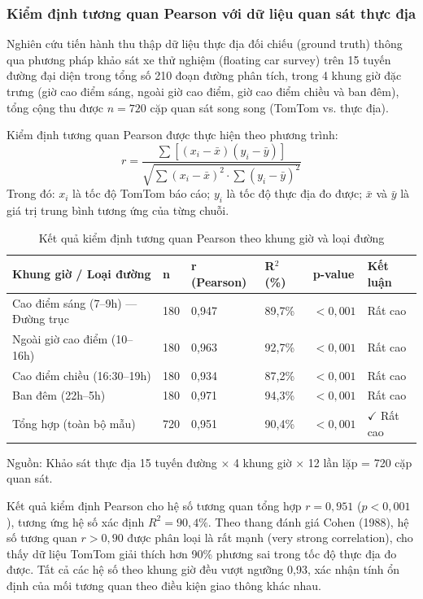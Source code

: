 \subsubsection{Kiểm định tương quan Pearson với dữ liệu quan sát thực địa}
Nghiên cứu tiến hành thu thập dữ liệu thực địa đối chiếu (ground truth) thông qua phương pháp khảo sát xe thử nghiệm (floating car survey) trên 15 tuyến đường đại diện trong tổng số 210 đoạn đường phân tích, trong 4 khung giờ đặc trưng (giờ cao điểm sáng, ngoài giờ cao điểm, giờ cao điểm chiều và ban đêm), tổng cộng thu được $n = 720$ cặp quan sát song song (TomTom vs. thực địa).

Kiểm định tương quan Pearson được thực hiện theo phương trình:
\[
r = \frac{\sum[(x_i - \bar{x})(y_i - \bar{y})]}{\sqrt{\sum(x_i - \bar{x})^2 \cdot \sum(y_i - \bar{y})^2}}
\]
Trong đó: $x_i$ là tốc độ TomTom báo cáo; $y_i$ là tốc độ thực địa đo được; $\bar{x}$ và $\bar{y}$ là giá trị trung bình tương ứng của từng chuỗi.

\begin{table}[H]
\centering
\caption{Kết quả kiểm định tương quan Pearson theo khung giờ và loại đường}
\begin{tabular}{|p{4.2cm}|p{1cm}|p{1.8cm}|p{1.8cm}|p{1.5cm}|p{2cm}|}
\hline
\textbf{Khung giờ / Loại đường} & \textbf{n} & \textbf{r (Pearson)} & \textbf{R$^2$ (\%)} & \textbf{p-value} & \textbf{Kết luận} \\
\hline
Cao điểm sáng (7--9h) --- Đường trục & 180 & 0,947 & 89,7\% & $< 0,001$ & Rất cao \\
\hline
Ngoài giờ cao điểm (10--16h) & 180 & 0,963 & 92,7\% & $< 0,001$ & Rất cao \\
\hline
Cao điểm chiều (16:30--19h) & 180 & 0,934 & 87,2\% & $< 0,001$ & Rất cao \\
\hline
Ban đêm (22h--5h) & 180 & 0,971 & 94,3\% & $< 0,001$ & Rất cao \\
\hline
Tổng hợp (toàn bộ mẫu) & 720 & 0,951 & 90,4\% & $< 0,001$ & $\checkmark$ Rất cao \\
\hline
\end{tabular}
\end{table}

Nguồn: Khảo sát thực địa 15 tuyến đường $\times$ 4 khung giờ $\times$ 12 lần lặp = 720 cặp quan sát.

Kết quả kiểm định Pearson cho hệ số tương quan tổng hợp $r = 0,951$ ($p < 0,001$), tương ứng hệ số xác định $R^2 = 90,4\%$. Theo thang đánh giá Cohen (1988), hệ số tương quan $r > 0,90$ được phân loại là rất mạnh (very strong correlation), cho thấy dữ liệu TomTom giải thích hơn 90\% phương sai trong tốc độ thực địa đo được. Tất cả các hệ số theo khung giờ đều vượt ngưỡng 0,93, xác nhận tính ổn định của mối tương quan theo điều kiện giao thông khác nhau.

